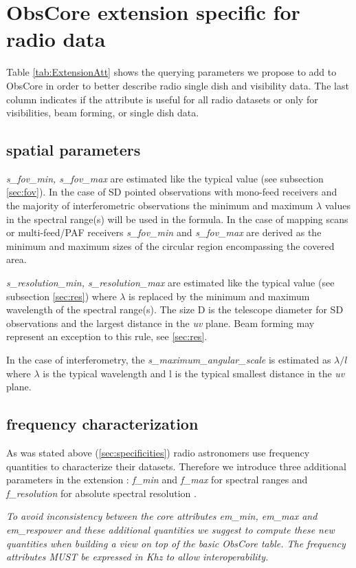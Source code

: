 \documentclass[11pt,a4paper]{ivoa}
\begin{document}
\section{ObsCore extension specific for radio data}

Table \ref{tab:ExtensionAtt} shows the %
querying parameters we propose to add to ObsCore in order to better describe radio single dish and visibility data.
The last column indicates if the attribute is useful for all radio datasets or only for visibilities, beam forming, or single dish data.

\subsection{spatial parameters}
\emph{s\_fov\_min, s\_fov\_max} are estimated like the typical value (see subsection \ref{sec:fov}). 
In the case of SD pointed observations with mono-feed receivers and the majority of interferometric observations the minimum and maximum
$\lambda$ values in the spectral range(s) will be used in the formula. In the case of mapping scans or multi-feed/PAF receivers
\emph{ s\_fov\_min} and \emph{s\_fov\_max} are derived as the minimum and maximum sizes of the circular region encompassing the covered area.


\emph{s\_resolution\_min, s\_resolution\_max} are estimated like the typical value (see subsection \ref{sec:res}) where $\lambda$ is replaced by the minimum and maximum wavelength of the spectral range(s). The size D is the telescope diameter for SD observations and the largest distance in the \emph{uv} plane. Beam forming may represent an exception to this rule, see \ref{sec:res}.


In the case of interferometry, the \emph{s\_maximum\_angular\_scale} is estimated as $\lambda/l$ where $\lambda$ is the typical
wavelength and l is the typical smallest distance in the \emph{uv} plane.


\subsection{frequency characterization}

As was stated above (\ref{sec:specificities}) radio astronomers use frequency quantities to characterize their datasets. Therefore we introduce three additional parameters in the extension : \emph{f\_min} and \emph{f\_max} for spectral ranges and \emph{f\_resolution} for absolute spectral resolution .

\textit{To avoid inconsistency between the core attributes \emph{em\_min, em\_max} and \emph{em\_respower} and these additional quantities we suggest to compute these new quantities when building a view on top of the basic ObsCore table. The frequency attributes MUST be expressed in Khz to allow interoperability.} 
\end{document}
